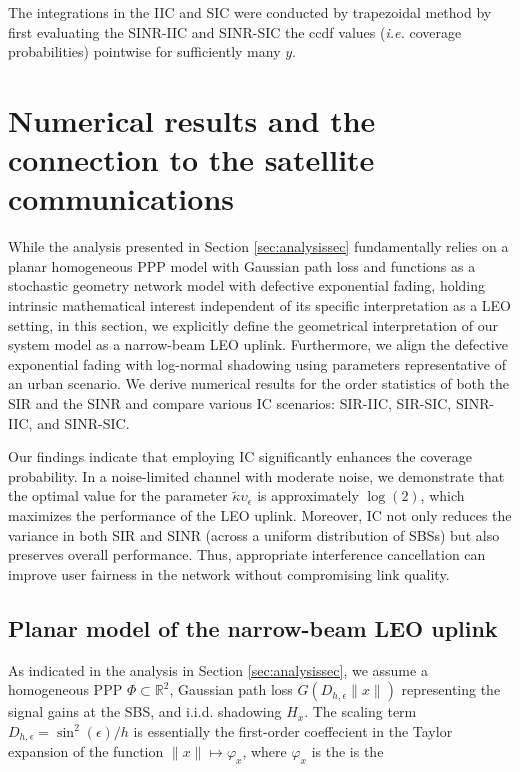 \documentclass[lettersize,journal]{IEEEtran}
\newcommand{\R}{\mathbb{R}}
\begin{document}
The integrations in the IIC and SIC were conducted by trapezoidal method by first evaluating the SINR-IIC and SINR-SIC the ccdf values (\textit{i.e.} coverage probabilities) pointwise for sufficiently many $y$.






\section{Numerical results and the connection to the satellite communications}

\label{sec:numericalresultsandconnectiontoLEO}
While the analysis presented in Section \ref{sec:analysissec} fundamentally relies on a planar homogeneous PPP model with Gaussian path loss and functions as a stochastic geometry network model with defective exponential fading, holding intrinsic mathematical interest independent of its specific interpretation as a LEO setting, in this section, we explicitly define the geometrical interpretation of our system model as a narrow-beam LEO uplink. Furthermore, we align the defective exponential fading with log-normal shadowing using parameters representative of an urban scenario. We derive numerical results for the order statistics of both the SIR and the SINR and compare various IC scenarios: SIR-IIC, SIR-SIC, SINR-IIC, and SINR-SIC.

Our findings indicate that employing IC significantly enhances the coverage probability. In a noise-limited channel with moderate noise, we demonstrate that the optimal value for the parameter $\tilde{\kappa} \upsilon_{\epsilon}$ is approximately $\log(2)$, which maximizes the performance of the LEO uplink. Moreover, IC not only reduces the variance in both SIR and SINR (across a uniform distribution of SBSs) but also preserves overall performance. Thus, appropriate interference cancellation can improve user fairness in the network without compromising link quality.



\subsection{Planar model of the narrow-beam LEO uplink}

As indicated in the analysis in Section \ref{sec:analysissec}, we assume a homogeneous PPP $\Phi \subset \R^2$, Gaussian path loss $G(D_{h,\epsilon}\|x\|)$ representing the signal gains at the SBS, and i.i.d. shadowing $H_x$. The scaling term $D_{h,\epsilon} = \sin^2(\epsilon)/h$ is essentially the first-order coeffecient in the Taylor expansion of the function $\|x\| \mapsto \varphi_x$, where $\varphi_x$ is the is the 
\end{document}
